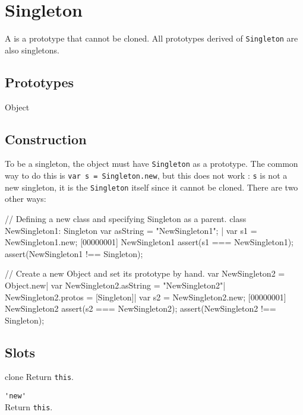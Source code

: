 
\section{Singleton}

A  is a prototype that cannot be cloned. All prototypes
derived of \lstinline{Singleton} are also singletons.

\subsection{Prototypes}
\begin{refObjects}
\item[Object]
\end{refObjects}

\subsection{Construction}

To be a singleton, the object must have \lstinline{Singleton} as a
prototype. The common way to do this is
%
\lstinline{var s = Singleton.new},
%
but this does not work : \lstinline|s| is not a new singleton, it is
the \lstinline|Singleton| itself since it cannot be cloned. There are
two other ways:

\begin{urbiscript}[firstnumber=1]
// Defining a new class and specifying Singleton as a parent.
class NewSingleton1: Singleton
{
  var asString = "NewSingleton1";
}|
var s1 = NewSingleton1.new;
[00000001] NewSingleton1
assert(s1 === NewSingleton1);
assert(NewSingleton1 !== Singleton);

// Create a new Object and set its prototype by hand.
var NewSingleton2 = Object.new|
var NewSingleton2.asString = "NewSingleton2"|
NewSingleton2.protos = [Singleton]|
var s2 = NewSingleton2.new;
[00000001] NewSingleton2
assert(s2 === NewSingleton2);
assert(NewSingleton2 !== Singleton);
\end{urbiscript}

\subsection{Slots}
\begin{urbiscriptapi}
\item[clone]
  Return \lstinline|this|.

\item \lstinline|'new'|\\
  Return \lstinline|this|.
\end{urbiscriptapi}

